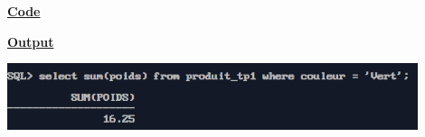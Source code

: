\newpage
{}

\textbf{\underline{Code}}


\vspace{1cm}
\textbf{\underline{Output}}
\vspace{1cm}
\begin{center}
    \includegraphics[width=0.9\textwidth]{Questions/q28/q28.png}
\end{center}


